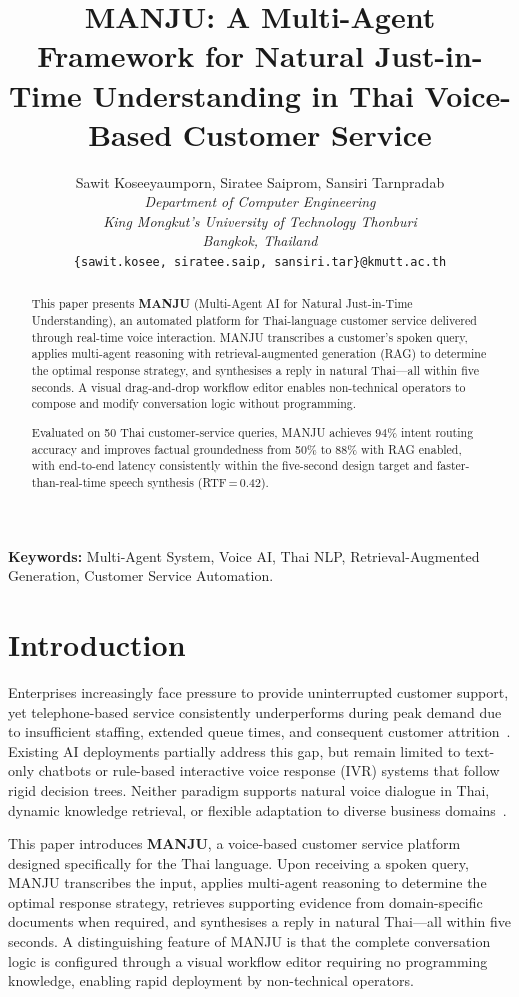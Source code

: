 \documentclass[10pt, a4paper, twocolumn]{article}
\title{\textbf{MANJU: A Multi-Agent Framework for Natural Just-in-Time Understanding in Thai Voice-Based Customer Service}}
\author{
    Sawit Koseeyaumporn, Siratee Saiprom, Sansiri Tarnpradab \\
    \textit{Department of Computer Engineering} \\
    \textit{King Mongkut's University of Technology Thonburi} \\
    \textit{Bangkok, Thailand} \\
    \texttt{\{sawit.kosee, siratee.saip, sansiri.tar\}@kmutt.ac.th}
}
\date{}
\begin{document}
\maketitle

\begin{abstract}
This paper presents \textbf{MANJU} (Multi-Agent AI for Natural
Just-in-Time Understanding), an automated platform for Thai-language
customer service delivered through real-time voice interaction.
MANJU transcribes a customer's spoken query, applies multi-agent
reasoning with retrieval-augmented generation (RAG) to determine the
optimal response strategy, and synthesises a reply in natural
Thai---all within five seconds.
A visual drag-and-drop workflow editor enables non-technical operators
to compose and modify conversation logic without programming.

Evaluated on 50 Thai customer-service queries, MANJU achieves 94\%
intent routing accuracy and improves factual groundedness from 50\%
to 88\% with RAG enabled, with end-to-end latency consistently within
the five-second design target and faster-than-real-time speech
synthesis (RTF\,=\,0.42).
\end{abstract}

\vspace{0.5em}
\noindent\textbf{Keywords:} Multi-Agent System, Voice AI, Thai NLP,
Retrieval-Augmented Generation, Customer Service Automation.

\section{Introduction}

Enterprises increasingly face pressure to provide uninterrupted customer
support, yet telephone-based service consistently underperforms during
peak demand due to insufficient staffing, extended queue times, and
consequent customer attrition~\cite{gans2003callcenters}.
Existing AI deployments partially address this gap, but remain limited to
text-only chatbots or rule-based interactive voice response (IVR) systems
that follow rigid decision trees.
Neither paradigm supports natural voice dialogue in Thai, dynamic knowledge
retrieval, or flexible adaptation to diverse business
domains~\cite{manjuProgReport}.

This paper introduces \textbf{MANJU}, a voice-based customer service
platform designed specifically for the Thai language.
Upon receiving a spoken query, MANJU transcribes the input, applies
multi-agent reasoning to determine the optimal response strategy, retrieves
supporting evidence from domain-specific documents when required, and
synthesises a reply in natural Thai---all within five seconds.
A distinguishing feature of MANJU is that the complete conversation logic
is configured through a visual workflow editor requiring no programming
knowledge, enabling rapid deployment by non-technical operators.
\end{document}
